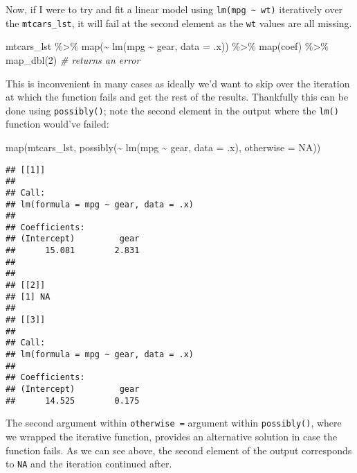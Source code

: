 \documentclass[
]{book}
\newenvironment{Shaded}{\begin{snugshade}}{\end{snugshade}}
\newcommand{\AttributeTok}[1]{\textcolor[rgb]{0.77,0.63,0.00}{#1}}
\newcommand{\CommentTok}[1]{\textcolor[rgb]{0.56,0.35,0.01}{\textit{#1}}}
\newcommand{\ConstantTok}[1]{\textcolor[rgb]{0.00,0.00,0.00}{#1}}
\newcommand{\DecValTok}[1]{\textcolor[rgb]{0.00,0.00,0.81}{#1}}
\newcommand{\FunctionTok}[1]{\textcolor[rgb]{0.00,0.00,0.00}{#1}}
\newcommand{\NormalTok}[1]{#1}
\newcommand{\SpecialCharTok}[1]{\textcolor[rgb]{0.00,0.00,0.00}{#1}}
\begin{document}
Now, if I were to try and fit a linear model using \texttt{lm(mpg\ \textasciitilde{}\ wt)} iteratively over the \texttt{mtcars\_lst}, it will fail at the second element as the \texttt{wt} values are all missing.

\begin{Shaded}
\begin{Highlighting}[]
\NormalTok{mtcars\_lst }\SpecialCharTok{\%\textgreater{}\%}
  \FunctionTok{map}\NormalTok{(}\SpecialCharTok{\textasciitilde{}} \FunctionTok{lm}\NormalTok{(mpg }\SpecialCharTok{\textasciitilde{}}\NormalTok{ gear, }\AttributeTok{data =}\NormalTok{ .x)) }\SpecialCharTok{\%\textgreater{}\%}
  \FunctionTok{map}\NormalTok{(coef) }\SpecialCharTok{\%\textgreater{}\%}
  \FunctionTok{map\_dbl}\NormalTok{(}\DecValTok{2}\NormalTok{) }\CommentTok{\# returns an error}
\end{Highlighting}
\end{Shaded}

This is inconvenient in many cases as ideally we'd want to skip over the iteration at which the function fails and get the rest of the results. Thankfully this can be done using \texttt{possibly()}; note the second element in the output where the \texttt{lm()} function would've failed:

\begin{Shaded}
\begin{Highlighting}[]
\FunctionTok{map}\NormalTok{(mtcars\_lst, }\FunctionTok{possibly}\NormalTok{(}\SpecialCharTok{\textasciitilde{}} \FunctionTok{lm}\NormalTok{(mpg }\SpecialCharTok{\textasciitilde{}}\NormalTok{ gear, }\AttributeTok{data =}\NormalTok{ .x), }\AttributeTok{otherwise =} \ConstantTok{NA}\NormalTok{))}
\end{Highlighting}
\end{Shaded}

\begin{verbatim}
## [[1]]
## 
## Call:
## lm(formula = mpg ~ gear, data = .x)
## 
## Coefficients:
## (Intercept)         gear  
##      15.081        2.831  
## 
## 
## [[2]]
## [1] NA
## 
## [[3]]
## 
## Call:
## lm(formula = mpg ~ gear, data = .x)
## 
## Coefficients:
## (Intercept)         gear  
##      14.525        0.175
\end{verbatim}

The second argument within \texttt{otherwise\ =} argument within \texttt{possibly()}, where we wrapped the iterative function, provides an alternative solution in case the function fails. As we can see above, the second element of the output corresponds to \texttt{NA} and the iteration continued after.
\end{document}
